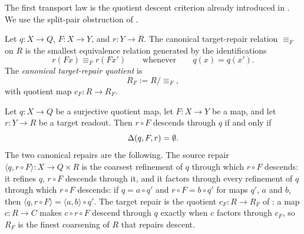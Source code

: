 The first transport law is the quotient descent criterion already
introduced in .  We use the split-pair obstruction of
.

\begin{definition}\label{def:target-repair}
Let \(q:X\to Q\), \(F:X\to Y\), and \(r:Y\to R\).  The canonical
target-repair relation \(\equiv_F\) on \(R\) is the smallest
equivalence relation generated by the identifications
\[
  r(Fx)\equiv_F r(Fx')
  \qquad\text{whenever}\qquad
  q(x)=q(x').
\]
The \emph{canonical target-repair quotient} is
\[
  R_F:=R/{\equiv_F},
\]
with quotient map \(c_F:R\to R_F\).
\end{definition}

\begin{theorem}\label{thm:F2}
Let \(q:X\to Q\) be a surjective quotient map, let \(F:X\to Y\) be a map, and
let \(r:Y\to R\) be a target readout.  Then \(r\circ F\) descends
through \(q\) if and only if
\[
  \Delta(q,F,r)=\emptyset .
\]
The two canonical repairs are the following. The source repair
\(\langle q,r\circ F\rangle:X\to Q\times R\) is the coarsest refinement of
\(q\) through which \(r\circ F\) descends: it refines \(q\), \(r\circ F\)
descends through it, and it factors through every refinement of \(q\)
through which \(r\circ F\) descends: if \(q=a\circ q'\) and
\(r\circ F=b\circ q'\) for maps \(q'\), \(a\) and \(b\), then
\(\langle q,r\circ F\rangle=\langle a,b\rangle\circ q'\). The target repair is the quotient
\(c_F:R\to R_F\) of : a map \(c:R\to C\) makes
\(c\circ r\circ F\) descend through \(q\) exactly when \(c\) factors through
\(c_F\), so \(R_F\) is the finest coarsening of \(R\) that repairs descent.
\end{theorem}

